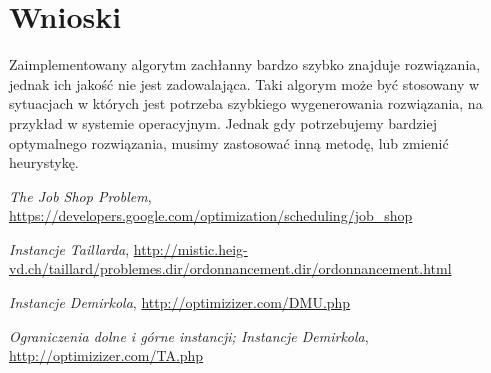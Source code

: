 \documentclass[11pt,twocolumn]{article}
\begin{document}
\section{Wnioski}

Zaimplementowany algorytm zachłanny bardzo szybko znajduje rozwiązania,
jednak ich jakość nie jest zadowalająca.
Taki algorym może być stosowany w sytuacjach w których jest potrzeba
szybkiego wygenerowania rozwiązania,
na przykład w systemie operacyjnym.
Jednak gdy potrzebujemy bardziej optymalnego rozwiązania,
musimy zastosować inną metodę, lub zmienić heurystykę.


\newpage

\begin{thebibliography}{9}

    \textit{The Job Shop Problem},
    \url{https://developers.google.com/optimization/scheduling/job_shop}

    \textit{Instancje Taillarda},
    \url{http://mistic.heig-vd.ch/taillard/problemes.dir/ordonnancement.dir/ordonnancement.html}

    \textit{Instancje Demirkola},
    \url{http://optimizizer.com/DMU.php}

    \textit{Ograniczenia dolne i górne instancji; Instancje Demirkola},
    \url{http://optimizizer.com/TA.php}

\end{thebibliography}
\end{document}
